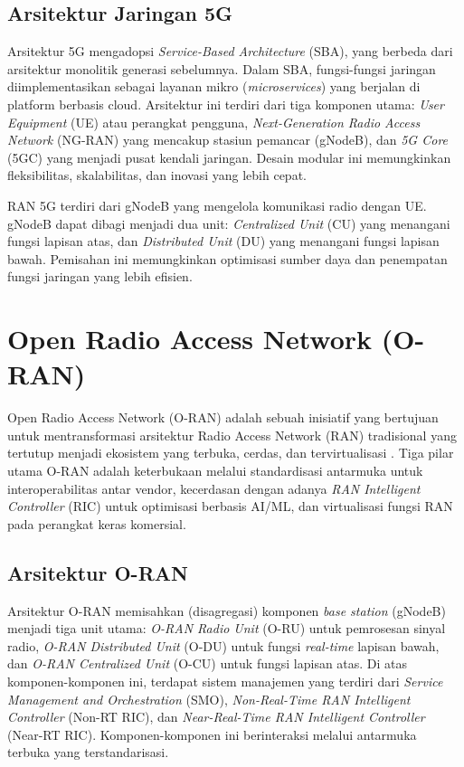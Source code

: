 \subsection{Arsitektur Jaringan 5G}
Arsitektur 5G mengadopsi \textit{Service-Based Architecture} (SBA), yang berbeda dari arsitektur monolitik generasi sebelumnya. Dalam SBA, fungsi-fungsi jaringan diimplementasikan sebagai layanan mikro (\textit{microservices}) yang berjalan di platform berbasis cloud. Arsitektur ini terdiri dari tiga komponen utama: \textit{User Equipment} (UE) atau perangkat pengguna, \textit{Next-Generation Radio Access Network} (NG-RAN) yang mencakup stasiun pemancar (gNodeB), dan \textit{5G Core} (5GC) yang menjadi pusat kendali jaringan. Desain modular ini memungkinkan fleksibilitas, skalabilitas, dan inovasi yang lebih cepat.

RAN 5G terdiri dari gNodeB yang mengelola komunikasi radio dengan UE. gNodeB dapat dibagi menjadi dua unit: \textit{Centralized Unit} (CU) yang menangani fungsi lapisan atas, dan \textit{Distributed Unit} (DU) yang menangani fungsi lapisan bawah. Pemisahan ini memungkinkan optimisasi sumber daya dan penempatan fungsi jaringan yang lebih efisien.

\section{Open Radio Access Network (O-RAN)}
Open Radio Access Network (O-RAN) adalah sebuah inisiatif yang bertujuan untuk mentransformasi arsitektur Radio Access Network (RAN) tradisional yang tertutup menjadi ekosistem yang terbuka, cerdas, dan tervirtualisasi \cite{oran_alliance}. Tiga pilar utama O-RAN adalah keterbukaan melalui standardisasi antarmuka untuk interoperabilitas antar vendor, kecerdasan dengan adanya \textit{RAN Intelligent Controller} (RIC) untuk optimisasi berbasis AI/ML, dan virtualisasi fungsi RAN pada perangkat keras komersial.

\subsection{Arsitektur O-RAN}
Arsitektur O-RAN memisahkan (disagregasi) komponen \textit{base station} (gNodeB) menjadi tiga unit utama: \textit{O-RAN Radio Unit} (O-RU) untuk pemrosesan sinyal radio, \textit{O-RAN Distributed Unit} (O-DU) untuk fungsi \textit{real-time} lapisan bawah, dan \textit{O-RAN Centralized Unit} (O-CU) untuk fungsi lapisan atas. Di atas komponen-komponen ini, terdapat sistem manajemen yang terdiri dari \textit{Service Management and Orchestration} (SMO), \textit{Non-Real-Time RAN Intelligent Controller} (Non-RT RIC), dan \textit{Near-Real-Time RAN Intelligent Controller} (Near-RT RIC). Komponen-komponen ini berinteraksi melalui antarmuka terbuka yang terstandarisasi.

